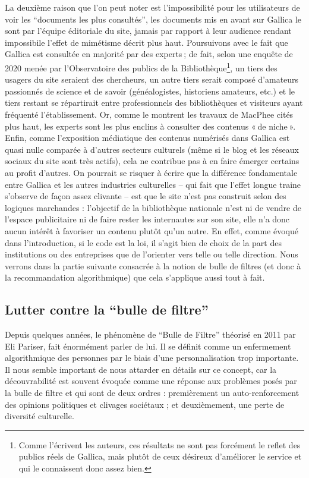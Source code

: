La deuxième raison que l’on peut noter est l’impossibilité pour les utilisateurs de voir les \enquote{documents les plus consultés}, les documents mis en avant sur Gallica le sont par l’équipe éditoriale du site, jamais par rapport à leur audience rendant impossibile l’effet de mimétisme décrit plus haut. Poursuivons avec le fait que Gallica est consultée en majorité par des experts ; de fait, selon une enquête de 2020 menée par l’Observatoire des publics de la Bibliothèque\footnote{ Comme l’écrivent les auteurs, ces résultats ne sont pas forcément le reflet des publics réels de Gallica, mais plutôt de ceux désireux d’améliorer le service et qui le connaissent donc assez bien.}, un tiers des usagers du site seraient des chercheurs, un autre tiers serait composé d’amateurs passionnés de science et de savoir (généalogistes, historiens amateurs, etc.) et le tiers restant se répartirait entre professionnels des bibliothèques et visiteurs ayant fréquenté l’établissement. Or, comme le montrent les travaux de MacPhee cités plus haut, les experts sont les plus enclins à consulter des contenus « de niche ». Enfin, comme l’exposition médiatique des contenus numérisés dans Gallica est quasi nulle comparée à d'autres secteurs culturels (même si le blog et les réseaux sociaux du site sont très actifs), cela ne contribue pas à en faire émerger certains au profit d’autres. On pourrait se risquer à écrire que la différence fondamentale entre Gallica et les autres industries culturelles -- qui fait que l’effet longue traine s’observe de façon assez clivante -- est que le site n’est pas construit selon des logiques marchandes : l’objectif de la bibliothèque nationale n’est ni de vendre de l’espace publicitaire ni de faire rester les internautes sur son site, elle n’a donc aucun intérêt à favoriser un contenu plutôt qu’un autre. En effet, comme évoqué dans l’introduction, si le code est la loi, il s’agit bien de choix de la part des institutions ou des entreprises que de l’orienter vers telle ou telle direction. Nous verrons dans la partie suivante consacrée à la notion de bulle de filtres (et donc à la recommandation algorithmique) que cela s’applique aussi tout à fait.

\subsection{Lutter contre la \enquote{bulle de filtre}}


Depuis quelques années, le phénomène de \enquote{Bulle de Filtre} théorisé en 2011 par Eli Pariser, fait énormément parler de lui. Il se définit comme un enfermement algorithmique des personnes par le biais d’une personnalisation trop importante. Il nous semble important de nous attarder en détails sur ce concept, car la découvrabilité est souvent évoquée comme une réponse aux problèmes posés par la bulle de filtre et qui sont de deux ordres : premièrement un auto-renforcement des opinions politiques et clivages sociétaux ; et deuxièmement, une perte de diversité culturelle.

